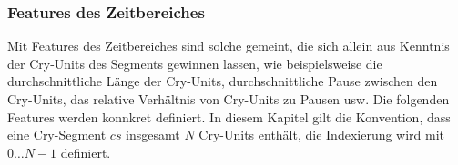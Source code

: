 
\subsubsection{Features des Zeitbereiches}

Mit Features des Zeitbereiches sind solche gemeint, die sich allein aus Kenntnis der Cry-Units des Segments gewinnen lassen, wie beispielsweise die durchschnittliche Länge der Cry-Units, durchschnittliche Pause zwischen den Cry-Units, das relative Verhältnis von Cry-Units zu Pausen usw. Die folgenden Features werden konnkret definiert. In diesem Kapitel gilt die Konvention, dass eine Cry-Segment $cs$ insgesamt $N$ Cry-Units enthält, die Indexierung wird mit $0 \ldots N-1$ definiert.

